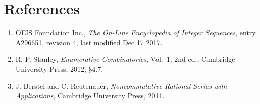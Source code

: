 \documentclass[11pt]{article}
\theoremstyle{definition}
\begin{document}
\section{References}

\begin{enumerate}

\item OEIS Foundation Inc., \emph{The On-Line Encyclopedia of Integer Sequences}, entry \href{https://oeis.org/A296651}{A296651}, revision 4, last modified Dec 17 2017.

\item R. P. Stanley, \emph{Enumerative Combinatorics}, Vol.~1, 2nd ed., Cambridge University Press, 2012; \S4.7.

\item J. Berstel and C. Reutenauer, \emph{Noncommutative Rational Series with Applications}, Cambridge University Press, 2011.

\end{enumerate}
\end{document}
